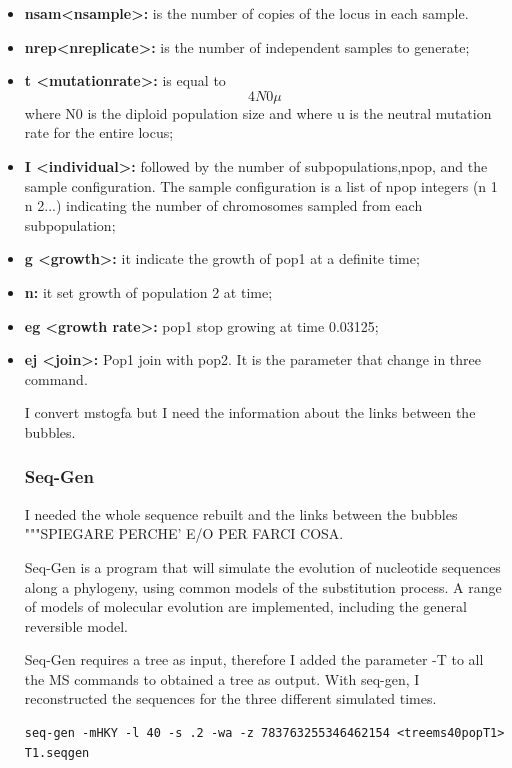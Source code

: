 \begin{itemize}
\item\textbf{nsam<nsample>:}
is the number of copies of the locus in each sample.

\item\textbf{nrep<nreplicate>:}
is the number of independent samples to generate;


\item\textbf{t <mutationrate>:}
is equal to $$4N0\mu$$ where N0 is the diploid population size and where u is the neutral mutation rate for the entire locus;

\item\textbf{I <individual>:}
followed by the number of subpopulations,npop, and the sample configuration. The sample configuration is a list of npop integers (n 1 n 2...) indicating the number of chromosomes sampled from each subpopulation;

\item\textbf{g <growth>:}
 it indicate the growth of pop1 at a definite time;

\item\textbf{n:}
it set growth of population 2 at time; 

\item\textbf{eg <growth rate>:}
pop1 stop growing at time 0.03125;

\item\textbf{ej <join>:}
Pop1 join with pop2. It is the parameter that change in three command. 

I convert mstogfa but I need the information about the links between the bubbles.  

\subsubsection{Seq-Gen}
I needed the whole sequence rebuilt and the links between the bubbles """SPIEGARE PERCHE' E/O PER FARCI COSA.

Seq-Gen \cite{rambaut1997seq} is a program that will simulate the evolution of nucleotide sequences along a phylogeny, using common models of the substitution process. A range of models of molecular evolution are implemented, including the general reversible model. 

Seq-Gen requires a tree as input, therefore I added the parameter -T to all the MS commands to obtained a tree as output. With seq-gen, I reconstructed the sequences for the three different simulated times.

\begin{verbatim}
seq-gen -mHKY -l 40 -s .2 -wa -z 783763255346462154 <treems40popT1> T1.seqgen


\end{verbatim}
\end{itemize}
